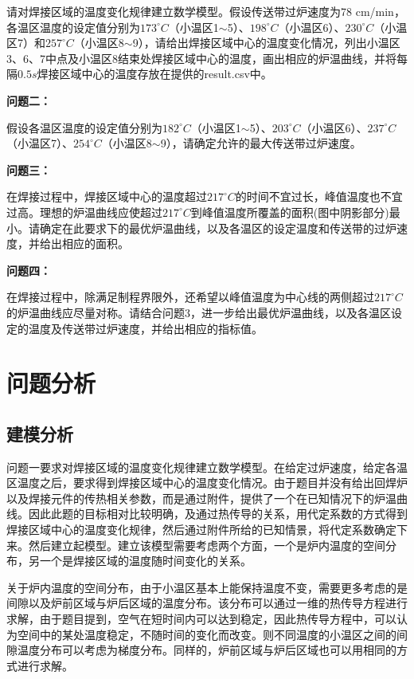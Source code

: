 \documentclass[withoutpreface,bwprint]{cumcmthesis} %
\begin{document}
请对焊接区域的温度变化规律建立数学模型。假设传送带过炉速度为78 cm/min，各温区温度的设定值分别为$173^{\circ}C$（小温区1$\sim$5）、$198^{\circ}C$（小温区6）、$230^{\circ}C$（小温区7）和$257^{\circ}C$（小温区8$\sim$9），请给出焊接区域中心的温度变化情况，列出小温区3、6、7中点及小温区8结束处焊接区域中心的温度，画出相应的炉温曲线，并将每隔$0.5s$焊接区域中心的温度存放在提供的result.csv中。

\begin{flushleft}
	\textbf{问题二：}
\end{flushleft}

假设各温区温度的设定值分别为$182^{\circ}C$（小温区1$\sim$5）、$203^{\circ}C$（小温区6）、$237^{\circ}C$（小温区7）、$254^{\circ}C$（小温区8$\sim$9），请确定允许的最大传送带过炉速度。

\begin{flushleft}
	\textbf{问题三：}
\end{flushleft}

在焊接过程中，焊接区域中心的温度超过$217^{\circ}C$的时间不宜过长，峰值温度也不宜过高。理想的炉温曲线应使超过$217^{\circ}C$到峰值温度所覆盖的面积(图中阴影部分)最小。请确定在此要求下的最优炉温曲线，以及各温区的设定温度和传送带的过炉速度，并给出相应的面积。

\begin{flushleft}
	\textbf{问题四：}
\end{flushleft}

在焊接过程中，除满足制程界限外，还希望以峰值温度为中心线的两侧超过$217^{\circ}C$的炉温曲线应尽量对称。请结合问题3，进一步给出最优炉温曲线，以及各温区设定的温度及传送带过炉速度，并给出相应的指标值。

\section{问题分析}
\subsection{建模分析} 
问题一要求对焊接区域的温度变化规律建立数学模型。在给定过炉速度，给定各温区温度之后，要求得到焊接区域中心的温度变化情况。由于题目并没有给出回焊炉以及焊接元件的传热相关参数，而是通过附件，提供了一个在已知情况下的炉温曲线。因此此题的目标相对比较明确，及通过热传导的关系，用代定系数的方式得到焊接区域中心的温度变化规律，然后通过附件所给的已知情景，将代定系数确定下来。然后建立起模型。建立该模型需要考虑两个方面，一个是炉内温度的空间分布，另一个是焊接区域的温度随时间变化的关系。

关于炉内温度的空间分布，由于小温区基本上能保持温度不变，需要更多考虑的是间隙以及炉前区域与炉后区域的温度分布。该分布可以通过一维的热传导方程进行求解，由于题目提到，空气在短时间内可以达到稳定，因此热传导方程中，可以认为空间中的某处温度稳定，不随时间的变化而改变。则不同温度的小温区之间的间隙温度分布可以考虑为梯度分布。同样的，炉前区域与炉后区域也可以用相同的方式进行求解。
\end{document}
